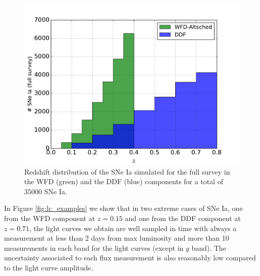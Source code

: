 \documentclass[\docopts]{\docclass}
\begin{document}
\begin{figure}[ht]
  \centering
  \includegraphics[width=\linewidth]{redshift_distribution_10_seasons.pdf}
  \caption{Redshift distribution of the SNe Ia simulated for the full survey in the WFD (green) and the DDF (blue) components for a total of $35000$ SNe Ia.}
  \label{fig:z_distrib}
\end{figure}
In Figure \ref{fig:lc_examples} we show that in two extreme cases of SNe Ia, one from the WFD component at $z=0.15$ and one from the DDF component at $z=0.71$, the light curves we obtain are well sampled in time with always a measurement at less than 2 days from max luminosity and more than 10 measurements in each band for the light curves (except in $g$ band).
The uncertainty associated to each flux measurement is also reasonably low compared to the light curve amplitude.
\end{document}
